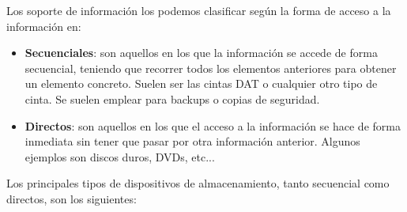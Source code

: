 Los soporte de información los podemos clasificar según la forma de acceso a la información en:
\begin{itemize}
    \item \textbf{Secuenciales}: son aquellos en los que la información se accede de forma secuencial, teniendo que recorrer todos los elementos anteriores para obtener un elemento concreto. Suelen ser las cintas DAT o cualquier otro tipo de cinta. Se suelen emplear para backups o copias de seguridad.
    \item \textbf{Directos}: son aquellos en los que el acceso a la información se hace de forma inmediata sin tener que pasar por otra información anterior. Algunos ejemplos son discos duros, DVDs, etc...
\end{itemize}

Los principales tipos de dispositivos de almacenamiento, tanto secuencial como directos, son los siguientes:

